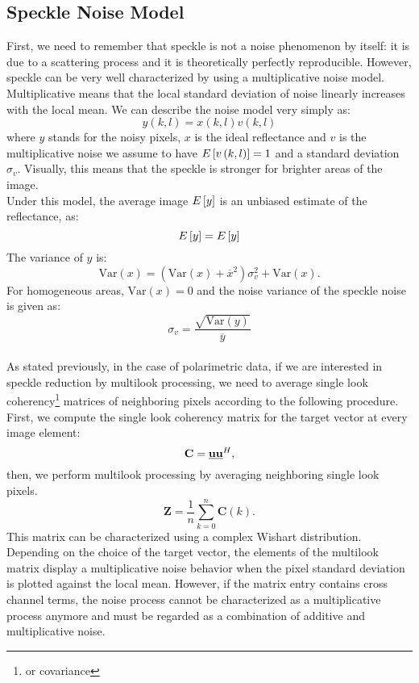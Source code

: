 \documentclass[11pt]{article}
\begin{document}
\subsection{Speckle Noise Model}
First, we need to remember that speckle is not a noise phenomenon by itself: it is due to a scattering process and it is theoretically perfectly reproducible. However, speckle can be very well characterized by using a multiplicative noise model. Multiplicative means that the local standard deviation of noise linearly increases with the local mean. We can describe the noise model very simply as:
\begin{equation}
	y\left(k,l\right) = x\left(k,l\right)v\left(k,l\right)
\end{equation}
where $y$ stands for the noisy pixels, $x$ is the ideal reflectance and $v$ is the multiplicative noise we assume to have $E\left[v\left(k,l\right)\right] = 1 $ and a standard deviation $\sigma_{v}$. Visually, this means that the speckle is stronger for brighter areas of the image.\\
Under this model, the average image $E\left[y\right]$ is an unbiased estimate of the reflectance, as:
\begin{equation}
	E\left[y\right] = E\left[y\right]
\end{equation}
The variance of $y$ is:
\begin{equation}
	\mathrm{Var}\left(x\right) = \left(\mathrm{Var}\left(x\right)+\overline{x}^{2}\right)\sigma_{v}^{2} + \mathrm{Var}\left(x\right).
\end{equation}
For homogeneous areas, $\mathrm{Var}\left(x\right) = 0$ and the noise variance of the speckle noise is given as:
\begin{equation}
	\sigma_{v} = \frac{\sqrt{\mathrm{Var}\left(y\right)}}{\overline{y}}
\end{equation}\\
As stated previously, in the case of polarimetric data, if we are interested in speckle reduction by multilook processing, we need to average single look coherency\footnote{or covariance} matrices of neighboring pixels according to the following procedure. First, we compute the single look coherency matrix for the target vector at every image element:
\begin{equation}
	\mathbf{C} = \mathbf{\underline{u}}\mathbf{\underline{u}}^{H},
\end{equation}
then, we perform multilook processing by averaging neighboring single look pixels.
\begin{equation}
	\mathbf{Z} = \frac{1}{n}\sum\limits_{k=0}^{n}\mathbf{C}\left(k\right).
\end{equation}
This matrix can be characterized using a complex Wishart distribution. Depending on the choice of the target vector, the elements of the multilook matrix display a multiplicative noise behavior when the pixel standard deviation is plotted against the local mean. However, if the matrix entry contains cross channel terms, the noise process cannot be characterized as a multiplicative process anymore and must be regarded as a combination of additive and multiplicative noise.
{}

\end{document}

